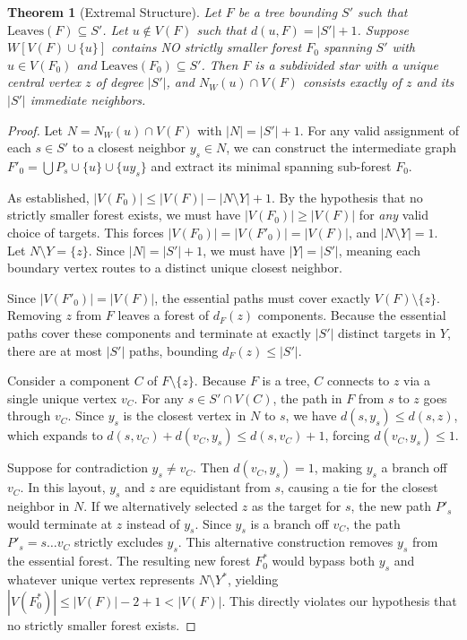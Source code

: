 \documentclass[11pt]{amsart}
\newtheorem{theorem}{Theorem}
\begin{document}
\begin{theorem}[Extremal Structure]\label{thm:extremal}
Let $F$ be a tree bounding $S'$ such that $\text{Leaves}(F) \subseteq S'$. Let $u \notin V(F)$ such that $d(u, F) = |S'| + 1$. Suppose $W[V(F) \cup \{u\}]$ contains NO strictly smaller forest $F_0$ spanning $S'$ with $u \in V(F_0)$ and $\text{Leaves}(F_0) \subseteq S'$. 
Then $F$ is a subdivided star with a unique central vertex $z$ of degree $|S'|$, and $N_W(u) \cap V(F)$ consists exactly of $z$ and its $|S'|$ immediate neighbors.
\end{theorem}

\begin{proof}
Let $N = N_W(u) \cap V(F)$ with $|N| = |S'| + 1$. For any valid assignment of each $s \in S'$ to a closest neighbor $y_s \in N$, we can construct the intermediate graph $F'_0 = \bigcup P_s \cup \{u\} \cup \{uy_s\}$ and extract its minimal spanning sub-forest $F_0$.

As established, $|V(F_0)| \le |V(F)| - |N \setminus Y| + 1$. By the hypothesis that no strictly smaller forest exists, we must have $|V(F_0)| \ge |V(F)|$ for \textit{any} valid choice of targets. This forces $|V(F_0)| = |V(F'_0)| = |V(F)|$, and $|N \setminus Y| = 1$. Let $N \setminus Y = \{z\}$. Since $|N| = |S'|+1$, we must have $|Y| = |S'|$, meaning each boundary vertex routes to a distinct unique closest neighbor.

Since $|V(F'_0)| = |V(F)|$, the essential paths must cover exactly $V(F) \setminus \{z\}$. Removing $z$ from $F$ leaves a forest of $d_F(z)$ components. Because the essential paths cover these components and terminate at exactly $|S'|$ distinct targets in $Y$, there are at most $|S'|$ paths, bounding $d_F(z) \le |S'|$.

Consider a component $C$ of $F \setminus \{z\}$. Because $F$ is a tree, $C$ connects to $z$ via a single unique vertex $v_C$. For any $s \in S' \cap V(C)$, the path in $F$ from $s$ to $z$ goes through $v_C$. Since $y_s$ is the closest vertex in $N$ to $s$, we have $d(s, y_s) \le d(s, z)$, which expands to $d(s, v_C) + d(v_C, y_s) \le d(s, v_C) + 1$, forcing $d(v_C, y_s) \le 1$. 

Suppose for contradiction $y_s \neq v_C$. Then $d(v_C, y_s) = 1$, making $y_s$ a branch off $v_C$. In this layout, $y_s$ and $z$ are equidistant from $s$, causing a tie for the closest neighbor in $N$.
If we alternatively selected $z$ as the target for $s$, the new path $P'_s$ would terminate at $z$ instead of $y_s$. Since $y_s$ is a branch off $v_C$, the path $P'_s = s \dots v_C$ strictly excludes $y_s$. This alternative construction removes $y_s$ from the essential forest. The resulting new forest $F^*_0$ would bypass both $y_s$ and whatever unique vertex represents $N \setminus Y^*$, yielding $|V(F^*_0)| \le |V(F)| - 2 + 1 < |V(F)|$.
This directly violates our hypothesis that no strictly smaller forest exists.


\end{proof}
\end{document}
